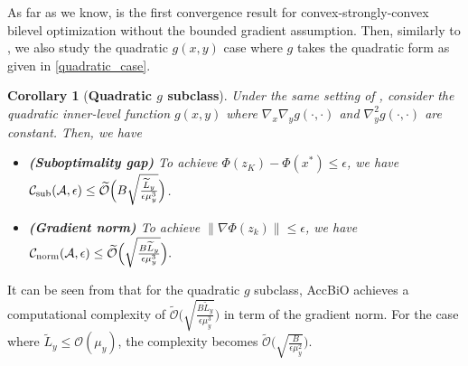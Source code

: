 \documentclass{osudissert96}
\newtheorem{corollary}{Corollary}
\begin{document}
As far as we know,  is the first convergence result for convex-strongly-convex bilevel optimization without the bounded gradient assumption. Then, similarly to , we also study the quadratic $g(x,y)$ case where $g$ takes the quadratic form as given in \cref{quadratic_case}.  
\begin{corollary}[\bf Quadratic $g$ subclass]\label{coro:quadaticConv}
Under the same setting of , consider the quadratic inner-level function $g(x,y)$ 
where  $\nabla_x\nabla_y g(\cdot,\cdot)$ and $\nabla_y^2 g(\cdot,\cdot)$ are constant. Then, we have
\begin{itemize}
\item {\bf (Suboptimality  gap)} To achieve $\Phi(z_K) - \Phi(x^*)\leq \epsilon$, we have $\mathcal{C}_{\text{\normalfont sub}}(\mathcal{A},\epsilon) \leq  \mathcal{\widetilde O}\Big(B \sqrt{\frac{\widetilde L_y}{\epsilon\mu_y^3}}\Big)$.
\item {\bf (Gradient norm)} To achieve $\|\nabla \Phi (z_k)\|\leq \epsilon$, we have $\mathcal{C}_{\text{\normalfont norm}}(\mathcal{A},\epsilon) \leq \mathcal{\widetilde O}\Big(\sqrt{\frac{B\widetilde L_y}{\epsilon\mu_y^3}}\Big).$
\end{itemize}
\end{corollary}
It can be seen from  that for the quadratic $g$ subclass, AccBiO achieves a computational complexity of $ \mathcal{\widetilde O}\Big(\sqrt{\frac{B\widetilde L_y}{\epsilon\mu_y^3}}\Big)$ in term of the gradient norm. For the case where $\widetilde L_y\leq\mathcal{O}(\mu_y)$, the complexity becomes $ \mathcal{\widetilde O}\Big(\sqrt{\frac{B}{\epsilon\mu_y^2}}\Big)$. %
\end{document}
